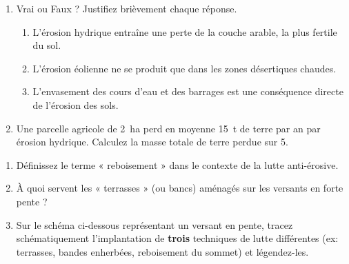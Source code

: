 \documentclass[11pt]{article}
\begin{document}
\begin{exercice}
\begin{enumerate}
    \item Vrai ou Faux ? Justifiez brièvement chaque réponse.
    \begin{enumerate}
        \item L'érosion hydrique entraîne une perte de la couche arable, la plus fertile du sol.
        \item L'érosion éolienne ne se produit que dans les zones désertiques chaudes.
        \item L'envasement des cours d'eau et des barrages est une conséquence directe de l'érosion des sols.
    \end{enumerate}
    \item Une parcelle agricole de \SI{2}{\hectare} perd en moyenne \SI{15}{\tonne} de terre par an par érosion hydrique. Calculez la masse totale de terre perdue sur \SI{5}{}.
\end{enumerate}
\end{exercice}

\begin{exercice}
\begin{enumerate}
    \item Définissez le terme « reboisement » dans le contexte de la lutte anti-érosive.
    \item À quoi servent les « terrasses » (ou bancs) aménagés sur les versants en forte pente ?
    \item Sur le schéma ci-dessous représentant un versant en pente, tracez schématiquement l'implantation de \textbf{trois} techniques de lutte différentes (ex: terrasses, bandes enherbées, reboisement du sommet) et légendez-les.
    \begin{center}
    \end{center}
\end{enumerate}
\end{exercice}
\end{document}
